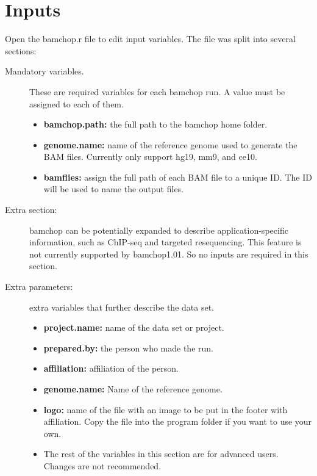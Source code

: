 \documentclass{article}
\begin{document}
\section{Inputs}
Open the bamchop.r file to edit input variables. The file was split into several sections:
\begin{description}
\item[Mandatory variables. ] These are required variables for each bamchop run. A value must be assigned to each of them. 
\begin{itemize}
  \item \textbf{bamchop.path: } the full path to the bamchop home folder.
  \item \textbf{genome.name: } name of the reference genome used to generate the BAM files. Currently only support hg19, mm9, and ce10.
  \item \textbf{bamflies: } assign the full path of each BAM file to a unique ID. The ID will be used to name the output files.
  \end{itemize}
\item[Extra section:] bamchop can be potentially expanded to describe application-specific information, such as ChIP-seq and targeted resequencing. This feature is not currently supported by bamchop1.01. So no inputs are required in this section. 
\item[Extra parameters:] extra variables that further describe the data set. 
  \begin{itemize}
  \item \textbf{project.name: } name of the data set or project.
  \item \textbf{prepared.by: } the person who made the run. 
  \item \textbf{affiliation: } affiliation of the person.
  \item \textbf{genome.name: } Name of the reference genome.
  \item \textbf{logo: } name of the file with an image to be put in the footer with affiliation. Copy the file into the program folder if you want to use your own.
  \item The rest of the variables in this section are for advanced users. Changes are not recommended.
  \end{itemize}
\end{description}
\end{document}
